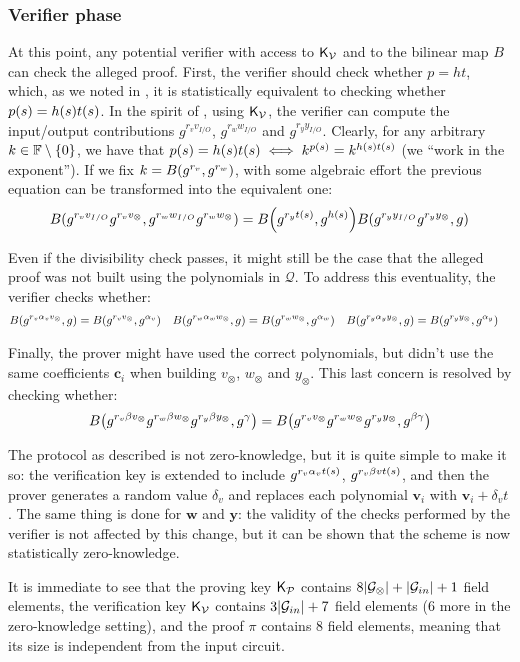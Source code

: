 \subsubsection*{Verifier phase}
At this point, any potential verifier with access to \(\mathsf{K}_\mathcal{V} \) and to the bilinear map 
\(B\) can check the alleged proof.
First, the verifier should check whether \(p = ht\), which, as we noted in , it is 
statistically equivalent to checking whether \(\call{p}{s} = \call{h}{s}\call{t}{s}\).
In the spirit of , using \(\mathsf{K}_\mathcal{V} \), the verifier can compute the 
input/output contributions \(g^{r_{v}v_{I/O}}\), \(g^{r_{w}w_{I/O}}\) and \(g^{r_{y}y_{I/O}}\).
Clearly, for any arbitrary \(k \in \mathbb{F} \setminus \left\{0\right\}\), we have that 
\(\call{p}{s} = \call{h}{s}\call{t}{s} \iff k^{\call{p}{s}} = k^{\call{h}{s}\call{t}{s}}\) (we 
``work in the exponent'').
If we fix \(k = \call{B}{g^{r_v}, g^{r_w}}\), with some algebraic effort the previous 
equation can be transformed into the equivalent one:
\[
  \call{B}{g^{r_{v}v_{I/O}}g^{r_{v}v_{\otimes}}, g^{r_{w}w_{I/O}}g^{r_{w}w_{\otimes}}} =
  \call{B}{g^{r_{y}\call{t}{s}}, g^{\call{h}{s}}}\call{B}{g^{r_{y}y_{I/O}}g^{r_{y}y_{\otimes}}, g}
\]

Even if the divisibility check passes, it might still be the case that the alleged 
proof was not built using the polynomials in \(\mathcal{Q}\).
To address this eventuality, the verifier checks whether:
\begin{align*}
  &  \call{B}{g^{r_{v}\alpha_{v}v_{\otimes}}, g} = \call{B}{g^{r_{v}v_{\otimes}}, g^{\alpha_v}}
  && \call{B}{g^{r_{w}\alpha_{w}w_{\otimes}}, g} = \call{B}{g^{r_{w}w_{\otimes}}, g^{\alpha_w}}
  && \call{B}{g^{r_{y}\alpha_{y}y_{\otimes}}, g} = \call{B}{g^{r_{y}y_{\otimes}}, g^{\alpha_y}}
\end{align*}

Finally, the prover might have used the correct polynomials, but didn't use the same 
coefficients \(\bm{c}_i\) when building \(v_{\otimes}\), \(w_{\otimes}\) and \(y_{\otimes}\).
This last concern is resolved by checking whether:
\[
  \call{B}{g^{r_{v}{\beta}v_{\otimes}}g^{r_{w}{\beta}w_{\otimes}}g^{r_{y}{\beta}y_{\otimes}}, g^{\gamma}} =
  \call{B}{g^{r_{v}v_{\otimes}}g^{r_{w}w_{\otimes}}g^{r_{y}y_{\otimes}}, g^{\beta\gamma}}
\]

The protocol as described is not zero-knowledge, but it is quite simple to make it so:
the verification key is extended to include \(g^{r_{v}\alpha_{v}t\left(s\right)}\), 
\(g^{r_{v}\beta{v}t\left(s\right)}\), and then the prover generates a random value \(\delta_v\) and 
replaces each polynomial \(\bm{v}_i\) with \(\bm{v}_i + \delta_{v}t\). 
The same thing is done for \(\bm{w}\) and \(\bm{y}\): the validity of the checks performed by the 
verifier is not affected by this change, but it can be shown that the scheme is now 
statistically zero-knowledge.

It is immediate to see that the proving key \(\mathsf{K}_\mathcal{P} \) contains 
\(8\abs{\mathcal{G}_{\otimes}} + \abs{\mathcal{G}_{in}} + 1\) field elements, the verification 
key \(\mathsf{K}_\mathcal{V} \) contains \(3\abs{\mathcal{G}_{in}} + 7\) field elements (\(6\) more in the 
zero-knowledge setting), and the proof \(\pi \) contains \(8\) field elements, meaning that its size
is independent from the input circuit.
